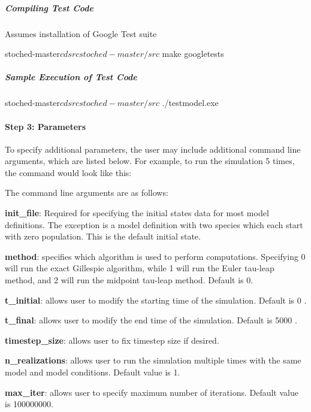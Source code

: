 \subparagraph*{Compiling Test Code}

Assumes installation of Google Test suite \begin{DoxyVerb}stoched-master$ cd src
stoched-master/src$ make googletests
\end{DoxyVerb}


\subparagraph*{Sample Execution of Test Code}

\begin{DoxyVerb}stoched-master$ cd src
stoched-master/src$ ./testmodel.exe
\end{DoxyVerb}


\paragraph*{Step 3\+: Parameters}

To specify additional parameters, the user may include additional command line arguments, which are listed below. For example, to run the simulation 5 times, the command would look like this\+: 


The command line arguments are as follows\+:

{\bfseries init\+\_\+file}\+: Required for specifying the initial states data for most model definitions. The exception is a model definition with two species which each start with zero population. This is the default initial state.

{\bfseries method}\+: specifies which algorithm is used to perform computations. Specifying 0 will run the exact Gillespie algorithm, while 1 will run the Euler tau-\/leap method, and 2 will run the midpoint tau-\/leap method. Default is 0.

{\bfseries t\+\_\+initial}\+: allows user to modify the starting time of the simulation. Default is 0 .

{\bfseries t\+\_\+final}\+: allows user to modify the end time of the simulation. Default is 5000 .

{\bfseries timestep\+\_\+size}\+: allows user to fix timestep size if desired.

{\bfseries n\+\_\+realizations}\+: allows user to run the simulation multiple times with the same model and model conditions. Default value is 1.

{\bfseries max\+\_\+iter}\+: allows user to specify maximum number of iterations. Default value is 100000000.

